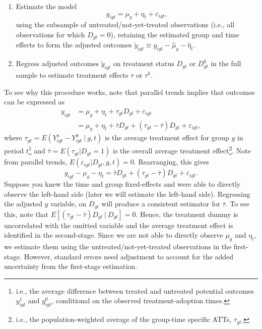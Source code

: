 \begin{enumerate}
\def\labelenumi{\arabic{enumi}.}
\item
  Estimate the model \[
   y_{igt} = \mu_g + \eta_t + \varepsilon_{igt},
  \] using the subsample of untreated/not-yet-treated observations
  (i.e., all observations for which \(D_{gt}=0\)), retaining the
  estimated group and time effects to form the adjusted outcomes
  \(\tilde{y}_{igt} \equiv y_{igt} - \hat{\mu}_g - \hat{\eta}_t\).
\item
  Regress adjusted outcomes \(\tilde{y}_{igt}\) on treatment status
  \(D_{gt}\) or \(D_{gt}^k\) in the full sample to estimate treatment
  effects \(\tau\) or \(\tau^k\).
\end{enumerate}

To see why this procedure works, note that parallel trends implies that
outcomes can be expressed as \begin{align*}
  y_{igt} &= \mu_g + \eta_t + \tau_{gt} D_{gt} + \varepsilon_{igt} \\
  &= \mu_g + \eta_t + \bar{\tau} D_{gt} + (\tau_{gt} - \bar{\tau}) D_{gt} + \varepsilon_{igt},
\end{align*} where \(\tau_{gt} = E(Y^1_{igt} - Y^0_{igt} \ | \ g, t)\)
is the average treatment effect for group \(g\) in period
\(t\)\footnote{i.e., the average difference between treated and
  untreated potential outcomes \(y^1_{igt}\) and \(y^0_{igt}\),
  conditional on the observed treatment-adoption times.} and
\(\bar{\tau} = E(\tau_{gt} | D_{gt}=1)\) is the overall average
treatment effect\footnote{i.e., the population-weighted average of the
  group-time specific ATTs, \(\tau_{gt}\).}. Note from parallel trends,
\(E(\varepsilon_{igt} | D_{gt}, g, t) = 0\). Rearranging, this gives \[
  y_{igt} - \mu_g - \eta_t = \bar{\tau} D_{gt} + (\tau_{gt} - \bar{\tau}) D_{gt} + \varepsilon_{igt}.
\] Suppose you knew the time and group fixed-effects and were able to
directly observe the left-hand side (later we will estimate the
left-hand side). Regressing the adjusted \(y\) variable, on \(D_{gt}\)
will produce a consistent estimator for \(\bar{\tau}\). To see this,
note that \(E[(\tau_{gt} - \bar{\tau}) D_{gt} \ | \ D_{gt}] = 0\).
Hence, the treatment dummy is uncorrelated with the omitted variable and
the average treatment effect is identified in the second-stage. Since we
are not able to directly observe \(\mu_g\) and \(\eta_t\), we estimate
them using the untreated/not-yet-treated observations in the
first-stage. However, standard errors need adjustment to account for the
added uncertainty from the first-stage estimation.


